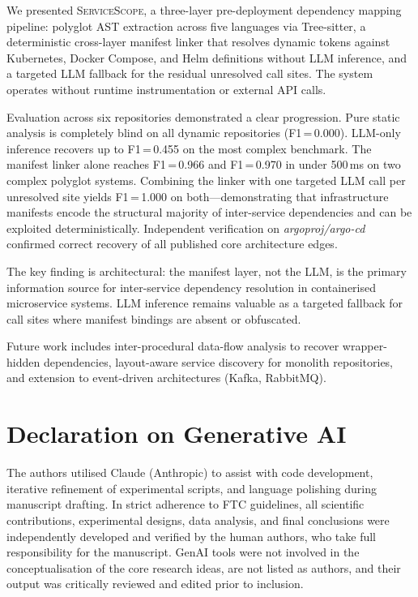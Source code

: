 \documentclass[runningheads]{llncs}
\begin{document}
We presented \textsc{ServiceScope}, a three-layer pre-deployment dependency
mapping pipeline: polyglot AST extraction across five languages via Tree-sitter,
a deterministic cross-layer manifest linker that resolves dynamic tokens
against Kubernetes, Docker Compose, and Helm definitions without LLM inference,
and a targeted LLM fallback for the residual unresolved call sites. The system
operates without runtime instrumentation or external API calls.

Evaluation across six repositories demonstrated a clear progression. Pure
static analysis is completely blind on all dynamic repositories
(F1\,=\,0.000). LLM-only inference recovers up to F1\,=\,0.455 on the most
complex benchmark. The manifest linker alone reaches F1\,=\,0.966 and
F1\,=\,0.970 in under 500\,ms on two complex polyglot systems. Combining the
linker with one targeted LLM call per unresolved site yields F1\,=\,1.000
on both---demonstrating that infrastructure manifests encode the structural
majority of inter-service dependencies and can be exploited deterministically.
Independent verification on \emph{argoproj/argo-cd} confirmed correct
recovery of all published core architecture edges.

The key finding is architectural: the manifest layer, not the LLM, is the
primary information source for inter-service dependency resolution in
containerised microservice systems. LLM inference remains valuable as a
targeted fallback for call sites where manifest bindings are absent or
obfuscated.

Future work includes inter-procedural data-flow analysis to recover
wrapper-hidden dependencies, layout-aware service discovery for monolith
repositories, and extension to event-driven architectures (Kafka, RabbitMQ).

\section*{Declaration on Generative AI}

The authors utilised Claude (Anthropic) to assist with code development,
iterative refinement of experimental scripts, and language polishing during
manuscript drafting. In strict adherence to FTC guidelines, all scientific
contributions, experimental designs, data analysis, and final conclusions
were independently developed and verified by the human authors, who take
full responsibility for the manuscript. GenAI tools were not involved in the
conceptualisation of the core research ideas, are not listed as authors, and
their output was critically reviewed and edited prior to inclusion.
\end{document}
